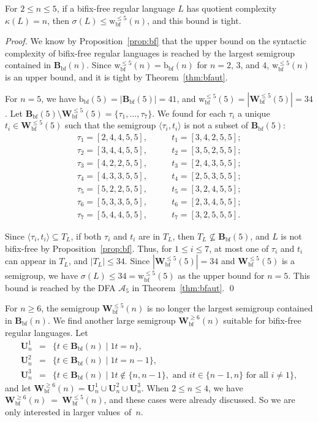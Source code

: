 \documentclass{llncs}
\renewcommand{\le}{\leqslant}
\renewcommand{\ge}{\geqslant}
\newcommand{\txt}[1]{\mbox{ #1 }}
\newcommand{\cA}{{\mathcal A}}
\newcommand{\Bbf}{\mathbf{B}_{\mathrm{bf}}}
\newcommand{\Vbf}{\mathbf{W}^{\le 5}_{\mathrm{bf}}}
\newcommand{\Wbf}{\mathbf{W}^{\ge 6}_{\mathrm{bf}}}
\newcommand{\Uf}{\mathbf{U}}
\newcommand{\bbf}{{\mathrm{b}_{\mathrm{bf}}}}
\newcommand{\vbf}{{\mathrm{w}^{\le 5}_{\mathrm{bf}}}}
\begin{document}
\begin{theorem}\label{thm:bfsmall} 
For $2 \le n \le 5$, if a bifix-free regular language $L$ has quotient complexity $\kappa(L) = n$, then $\sigma(L) \le \vbf(n)$, and this bound is tight. 
\end{theorem}

\begin{proof}
We know by Proposition~\ref{prop:bf} that the upper bound on the syntactic complexity of bifix-free regular languages is reached by the largest semigroup contained in $\Bbf(n)$. Since $\vbf(n) = \bbf(n)$ for $n = 2$, $3$, and $4$, $\vbf(n)$ is an upper bound, and it is tight by Theorem~\ref{thm:bfaut}. 

For $n = 5$, we have $\bbf(5) = |\Bbf(5)| = 41$, and $\vbf(5) = |\Vbf(5)| = 34$. Let $\Bbf(5) \setminus \Vbf(5) = \{\tau_1,\ldots,\tau_7\}$. We found for each $\tau_i$ a unique $t_i \in \Vbf(5)$ such that the semigroup $\langle \tau_i, t_i \rangle$ is not a subset of $\Bbf(5)$:
$$\begin{array}{ll}
 \tau_1 = [ 2, 4, 4, 5, 5 ], \quad & \quad t_1 = [ 3, 4, 2, 5, 5 ]; \\
 \tau_2 = [ 3, 4, 4, 5, 5 ], \quad & \quad t_2 = [ 3, 5, 2, 5, 5 ]; \\
 \tau_3 = [ 4, 2, 2, 5, 5 ], \quad & \quad t_3 = [ 2, 4, 3, 5, 5 ]; \\
 \tau_4 = [ 4, 3, 3, 5, 5 ], \quad & \quad t_4 = [ 2, 5, 3, 5, 5 ]; \\
 \tau_5 = [ 5, 2, 2, 5, 5 ], \quad & \quad t_5 = [ 3, 2, 4, 5, 5 ]; \\
 \tau_6 = [ 5, 3, 3, 5, 5 ], \quad & \quad t_6 = [ 2, 3, 4, 5, 5 ]; \\
 \tau_7 = [ 5, 4, 4, 5, 5 ], \quad & \quad t_7 = [ 3, 2, 5, 5, 5 ].
\end{array}$$

Since $\langle \tau_i, t_i \rangle \subseteq T_L$, if both $\tau_i$ and $t_i$ are in $T_L$,
then $T_L \not\subseteq \Bbf(5)$, and  $L$ is not bifix-free by Proposition~\ref{prop:bf}. Thus, for $1 \le i \le 7$, at most one of $\tau_i$ and $t_i$ can appear in $T_L$, and $|T_L| \le 34$. Since $|\Vbf(5)| = 34$ and $\Vbf(5)$ is a semigroup, we have $\sigma(L) \le 34 = \vbf(5)$ as the upper bound for $n = 5$. This bound is reached by the DFA $\cA_5$ in Theorem~\ref{thm:bfaut}. \qed 
\end{proof}


For $n \ge 6$, the semigroup $\Vbf(n)$ is no longer the largest semigroup contained in $\Bbf(n)$. We find another large semigroup $\Wbf(n)$ suitable for bifix-free regular languages. Let 
\begin{eqnarray*}
  \Uf^1_n &=& \{t \in \Bbf(n) \mid 1t = n \}, \\ 
  \Uf^2_n &=& \{t \in \Bbf(n) \mid 1t = n-1\}, \\
  \Uf^3_n &=& \{t \in \Bbf(n) \mid 1t \not\in \{n, n-1\}, \txt{and} it \in \{n-1, n\} \txt{for all} i \neq 1\}, 
\end{eqnarray*}
and let $\Wbf(n) = \Uf^1_n \cup \Uf^2_n \cup \Uf^3_n$. 
When $2 \le n \le 4$, we have $\Wbf(n)~=~\Vbf(n)$, and these cases were already discussed. So we are only interested in larger values~of~$n$. 
\end{document}
